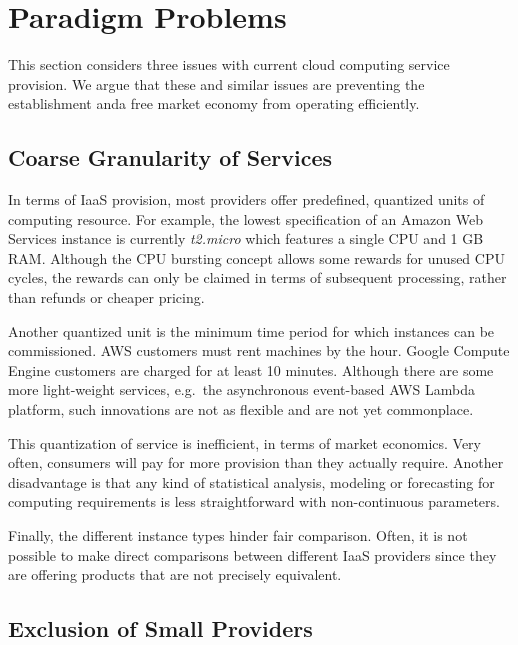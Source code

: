 \documentclass[conference,10pt]{IEEEtran}
\begin{document}

\section{Paradigm Problems}
\label{sec-probs}

This section considers three issues with current cloud computing service provision.
We argue that these and similar issues are preventing the establishment anda free market economy from operating efficiently.


\subsection{Coarse Granularity of Services}

In terms of IaaS provision, most providers offer predefined, quantized units of computing resource. For example, the lowest specification of an Amazon Web Services instance is currently \emph{t2.micro} which features a single CPU and 1 GB RAM. Although the CPU bursting concept allows some rewards for unused CPU cycles, the rewards can only be claimed in terms of subsequent processing, rather than refunds or cheaper pricing.  

Another quantized unit is the minimum time period for which instances can be commissioned. AWS customers must rent machines by the hour. Google Compute Engine customers are charged for at least 10 minutes.
Although there are some more light-weight services, e.g.\ the asynchronous event-based AWS Lambda platform, such innovations are not as flexible and are not yet commonplace.

This quantization of service is inefficient, in terms of market economics. Very often, consumers will pay for more provision than they actually require. Another disadvantage is that any kind of statistical analysis, modeling or forecasting for computing requirements is less straightforward with non-continuous parameters. 

Finally, the different instance types hinder fair comparison. Often, it is not possible to make direct comparisons between different IaaS providers since they are offering products that are not precisely equivalent.


\subsection{Exclusion of Small Providers}
\end{document}
